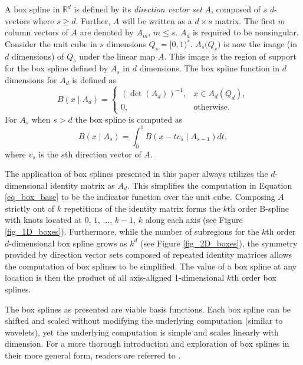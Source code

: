 A box spline in $\mathbb{R}^d$ is defined by its \textit{direction vector set} $A$, composed of $s$ $d$-vectors where $s \geq d$. Further, $A$ will be written as a $d \times s$ matrix. The first $m$ column vectors of $A$ are denoted by $A_m$, $m \leq s$. $A_d$ is required to be nonsingular. Consider the unit cube in $s$ dimensions $Q_s = [0,1)^s$. $A_s \bigl( Q_s \bigr)$ is now the image (in $d$ dimensions) of $Q_s$ under the linear map $A$. This image is the region of support for the box spline defined by $A_s$ in $d$ dimensions. The box spline function in $d$ dimensions for $A_d$ is defined as
\begin{equation}
B(x \mid A_d) = \begin{cases} 
(\det(A_d))^{-1}, & x \in A_d(Q_d), \\
0,                & \text{otherwise.}
\end{cases}
\label{eq_box_base}
\end{equation}
For $A_s$ when $s > d$ the box spline is computed as
\begin{equation}
B(x \mid A_s) = \int_0^1 B(x - t v_s \mid A_{s-1}) dt,
\label{eq_box_recursive}
\end{equation}
where $v_s$ is the $s$th direction vector of $A$.

The application of box splines presented in this paper always utilizes the $d$-dimensional identity matrix as $A_d$. This simplifies the computation in Equation \ref{eq_box_base} to be the indicator function over the unit cube. Composing $A$ strictly out of $k$ repetitions of the identity matrix forms the $k$th order B-spline with knots located at $0$, $1$, $\ldots$, $k-1$, $k$ along each axis (see Figure \ref{fig_1D_boxes}). Furthermore, while the number of subregions for the $k$th order $d$-dimensional box spline grows as $k^d$ (see Figure \ref{fig_2D_boxes}), the symmetry provided by direction vector sets composed of repeated identity matrices allows the computation of box splines to be simplified. The value of a box spline at any location is then the product of all axis-aligned 1-dimensional $k$th order box splines.

The box splines as presented are viable basis functions. Each box spline can be shifted and scaled without modifying the underlying computation (similar to wavelets), yet the underlying computation is simple and scales linearly with dimension. For a more thorough introduction and exploration of box splines in their more general form, readers are referred to \cite{de2013box}. 

